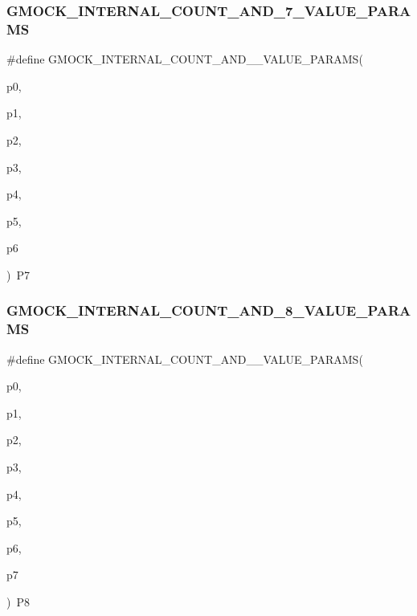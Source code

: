 \subsubsection{\texorpdfstring{GMOCK\_INTERNAL\_COUNT\_AND\_7\_VALUE\_PARAMS}{GMOCK\_INTERNAL\_COUNT\_AND\_7\_VALUE\_PARAMS}}
{\footnotesize\ttfamily \#define G\+M\+O\+C\+K\+\_\+\+I\+N\+T\+E\+R\+N\+A\+L\+\_\+\+C\+O\+U\+N\+T\+\_\+\+A\+N\+D\+\_\+\_\+\+V\+A\+L\+U\+E\+\_\+\+P\+A\+R\+A\+MS(\begin{DoxyParamCaption}\item[{}]{p0,  }\item[{}]{p1,  }\item[{}]{p2,  }\item[{}]{p3,  }\item[{}]{p4,  }\item[{}]{p5,  }\item[{}]{p6 }\end{DoxyParamCaption})~P7}

\mbox{\label{_obj__test_2lib_2googletest-release-1_88_81_2googlemock_2include_2gmock_2gmock-generated-actions_8h_a461b026c9cc310c199ab1f0b59111e5a}} 
\subsubsection{\texorpdfstring{GMOCK\_INTERNAL\_COUNT\_AND\_8\_VALUE\_PARAMS}{GMOCK\_INTERNAL\_COUNT\_AND\_8\_VALUE\_PARAMS}}
{\footnotesize\ttfamily \#define G\+M\+O\+C\+K\+\_\+\+I\+N\+T\+E\+R\+N\+A\+L\+\_\+\+C\+O\+U\+N\+T\+\_\+\+A\+N\+D\+\_\+\_\+\+V\+A\+L\+U\+E\+\_\+\+P\+A\+R\+A\+MS(\begin{DoxyParamCaption}\item[{}]{p0,  }\item[{}]{p1,  }\item[{}]{p2,  }\item[{}]{p3,  }\item[{}]{p4,  }\item[{}]{p5,  }\item[{}]{p6,  }\item[{}]{p7 }\end{DoxyParamCaption})~P8}

